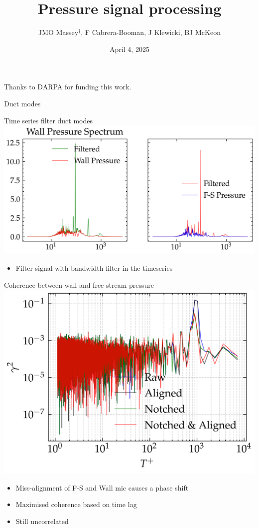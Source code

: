 \documentclass[aspectratio=169]{beamer}
\title{Pressure signal processing}
\author{JMO Massey$^{\dag}$, F Cabrera-Booman, J Klewicki, BJ McKeon}
\institute{Center for Turbulence Research \\ Stanford University}
\date{April 4, 2025}
\begin{document}
\begin{frame}
    \setcounter{framenumber}{0}
    \titlepage
    \vfill
    {\scriptsize \centering Thanks to DARPA for funding this work.\par}
\end{frame}

\begin{frame}{Duct modes}
\end{frame}

\begin{frame}{Time series filter duct modes}
    \centering
    \includegraphics[width=0.7\linewidth]{figures/notched_pressure_spectrum.png}
    \begin{itemize}
            \centering
        \item Filter signal with bandwidth filter in the timeseries
    \end{itemize}

\end{frame}

\begin{frame}{Coherence between wall and free-stream pressure}
    \centering
    \includegraphics[width=0.5\linewidth]{figures/coherence.png}
    \begin{itemize}
        \centering
        \item Miss-alignment of F-S and Wall mic causes a phase shift
        \item Maximised coherence based on time lag
        \item Still uncorrelated
    \end{itemize}
\end{frame}
\end{document}
